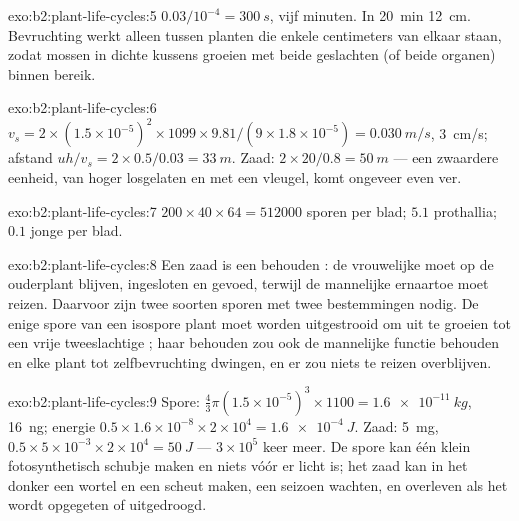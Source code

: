 \begin{solution}{exo:b2:plant-life-cycles:5}
$0.03/10^{-4} = \qty{300}{s}$, vijf minuten. In \qty{20}{min}
\qty{12}{cm}. Bevruchting werkt alleen tussen planten die enkele
centimeters van elkaar staan, zodat mossen in dichte kussens groeien met
beide geslachten (of beide organen) binnen bereik.
\end{solution}

\begin{solution}{exo:b2:plant-life-cycles:6}
$v_s = 2\times(1.5\times 10^{-5})^2\times 1099\times 9.81/(9\times
1.8\times 10^{-5}) = \qty{0.030}{m/s}$, \qty{3}{cm/s}; afstand $uh/v_s
= 2\times 0.5/0.03 = \qty{33}{m}$. Zaad: $2\times 20/0.8 =
\qty{50}{m}$ --- een zwaardere eenheid, van hoger losgelaten en met een
vleugel, komt ongeveer even ver.
\end{solution}

\begin{solution}{exo:b2:plant-life-cycles:7}
$200\times 40\times 64 = \num{512000}$ sporen per blad; $5.1$
prothallia; $0.1$ jonge  per blad.
\end{solution}

\begin{solution}{exo:b2:plant-life-cycles:8}
Een zaad is een behouden : de vrouwelijke  moet op
de ouderplant blijven, ingesloten en gevoed, terwijl de mannelijke
 ernaartoe moet reizen. Daarvoor zijn twee soorten sporen met
twee bestemmingen nodig. De enige spore van een isospore plant moet
worden uitgestrooid om uit te groeien tot een vrije tweeslachtige
; haar behouden zou ook de mannelijke functie behouden en elke
plant tot zelfbevruchting dwingen, en er zou niets te reizen overblijven.
\end{solution}

\begin{solution}{exo:b2:plant-life-cycles:9}
Spore: $\tfrac43\pi(1.5\times 10^{-5})^3\times 1100 =
\qty{1.6e-11}{kg}$, \qty{16}{ng}; energie $0.5\times 1.6\times
10^{-8}\times 2\times 10^{4} = \qty{1.6e-4}{J}$. Zaad: \qty{5}{mg},
$0.5\times 5\times 10^{-3}\times 2\times 10^{4} = \qty{50}{J}$ ---
$3\times 10^{5}$ keer meer. De spore kan één klein fotosynthetisch
schubje maken en niets vóór er licht is; het zaad kan in het donker een
wortel en een scheut maken, een seizoen wachten, en overleven als het
wordt opgegeten of uitgedroogd.
\end{solution}

